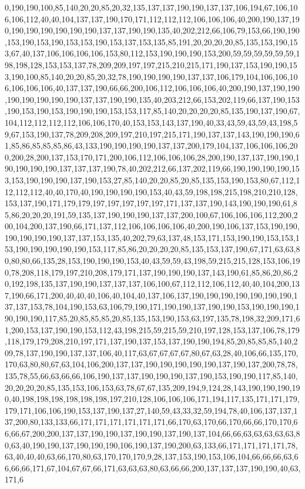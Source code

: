 0,190,190,100,85,140,20,20,85,20,32,135,137,137,190,190,137,137,106,194,67,106,106,106,112,40,40,104,137,137,190,170,171,112,112,112,106,106,106,40,200,190,137,190,190,190,190,190,190,190,137,137,190,190,135,40,202,212,66,106,79,153,66,190,190,153,190,153,190,153,153,190,153,137,153,135,85,191,20,20,20,20,85,135,153,190,153,67,40,137,106,106,106,106,153,80,112,153,190,190,190,153,200,59,59,59,59,59,59,198,198,128,153,153,137,78,209,209,197,197,215,210,215,171,190,137,153,190,190,153,190,100,85,140,20,20,85,20,32,78,190,190,190,190,137,137,106,179,104,106,106,106,106,106,106,40,137,137,190,66,66,200,106,112,106,106,106,40,200,190,137,190,190,190,190,190,190,190,137,137,190,190,135,40,203,212,66,153,202,119,66,137,190,153,190,153,190,153,190,190,190,153,153,117,85,140,20,20,20,20,85,135,190,137,190,67,104,112,112,112,112,106,106,170,40,153,153,143,137,190,40,33,43,59,43,59,43,198,59,67,153,190,137,78,209,208,209,197,210,197,215,171,190,137,137,143,190,190,190,61,85,86,85,85,85,86,43,133,190,190,190,190,137,137,200,179,104,137,106,106,106,200,200,28,200,137,153,170,171,200,106,112,106,106,106,28,200,190,137,137,190,190,190,190,190,190,137,137,137,190,78,40,202,212,66,137,202,119,66,190,190,190,190,153,153,190,190,190,137,190,153,27,85,140,20,20,85,20,85,135,153,190,153,80,67,112,112,112,112,40,40,170,40,190,190,190,190,153,40,43,59,198,198,215,198,210,210,128,153,137,190,171,179,179,197,197,197,197,197,171,137,137,190,143,190,190,190,61,85,86,20,20,20,191,59,135,137,190,190,190,137,137,200,100,67,106,106,106,112,200,200,104,200,137,190,66,171,137,112,106,106,106,106,40,200,190,106,137,153,190,190,190,190,190,190,137,137,153,135,40,202,79,63,137,48,153,171,153,190,190,153,153,153,190,190,190,190,190,153,117,85,86,20,20,20,20,85,135,153,137,190,67,171,63,63,80,80,80,66,135,28,153,190,190,190,153,40,43,59,59,43,198,59,215,215,128,153,106,190,78,208,118,179,197,210,208,179,171,137,190,190,190,137,143,190,61,85,86,20,86,20,192,198,135,137,190,190,137,137,137,106,100,67,112,112,106,112,40,40,104,200,137,190,66,171,200,40,40,40,106,40,104,40,137,106,137,190,190,190,190,190,190,190,137,137,153,78,104,190,153,63,106,79,190,171,190,190,137,190,190,153,190,190,190,190,190,190,117,85,20,85,85,85,20,85,135,153,190,153,63,197,135,78,198,32,209,171,61,200,153,137,190,190,153,112,43,198,215,59,215,59,210,197,128,153,137,106,78,179,118,179,179,208,210,197,171,137,190,137,153,137,190,190,194,85,20,85,85,85,140,209,78,137,190,190,137,137,106,40,117,63,67,67,67,67,80,67,63,28,40,106,66,135,170,170,63,80,80,67,63,104,106,200,137,137,190,190,190,190,190,137,190,137,200,78,78,135,78,55,66,63,66,66,106,190,137,137,190,190,190,137,190,153,190,190,117,85,140,20,20,20,20,85,135,153,106,153,63,78,67,67,135,209,194,9,124,28,143,190,190,190,190,40,198,198,198,198,198,198,197,210,128,106,106,106,171,194,117,135,171,171,179,179,171,106,106,190,153,137,190,137,27,140,59,43,33,32,59,194,78,40,106,137,137,137,200,80,133,133,66,171,171,171,171,171,171,66,170,63,170,66,170,66,66,170,170,66,66,67,200,200,137,137,190,190,137,190,190,137,190,137,104,66,66,63,63,63,63,63,80,63,40,190,190,137,190,190,190,106,190,137,190,200,63,133,66,171,171,171,171,78,63,40,40,40,63,66,170,80,63,170,170,170,9,28,137,153,190,153,106,104,66,66,66,63,66,66,66,171,67,104,67,67,66,171,63,63,63,80,63,66,66,200,137,137,137,190,190,40,63,171,6